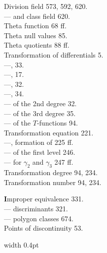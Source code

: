 
\noindent
\begin{minipage}[t]{0.48\textwidth}
\noindent Division field 573, 592, 620.\\
--- and class field 620.\\
Theta function 68 ff.\\
Theta null values 85.\\
Theta quotients 88 ff.\\
Transformation of differentials 5.\\
---,  33.\\
---,  17.\\
---,  32.\\
---,  34.\\
--- of the 2nd degree 32.\\
--- of the 3rd degree 35.\\
--- of the $T$-functions 94.\\
Transformation equation 221.\\
---, formation of 225 ff.\\
--- of the first level 246.\\
--- for $\gamma_2$ and $\gamma_3$ 247 ff.\\
Transformation degree 94, 234.\\
Transformation number 94, 234.

\noindent \textbf{I}mproper equivalence 331.\\
--- discriminants 321.\\
--- polygon classes 674.\\
Points of discontinuity 53.
\end{minipage}%
\hfill\vrule width 0.4pt\hfill
